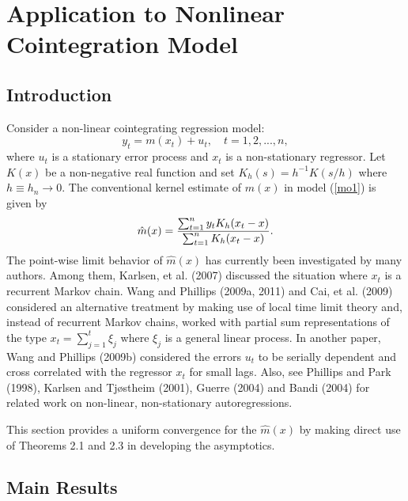 \chapter{Application to Nonlinear Cointegration Model}
\ifpdf
    \graphicspath{{Chapter3/Chapter3Figs/PNG/}{Chapter3/Chapter3Figs/PDF/}{Chapter3/Chapter3Figs/}}
\else
    \graphicspath{{Chapter3/Chapter3Figs/EPS/}{Chapter3/Chapter3Figs/}}
\fi

\section{Introduction}

Consider a non-linear cointegrating regression model:
\begin{equation}
y_{t}=m(x_{t})+u_{t},\quad t=1,2,...,n,  \label{mo1}
\end{equation}%
where $u_{t}$ is a stationary error process and $x_{t}$ is a
non-stationary
regressor. Let $K(x)$ be a non-negative real function and set $%
K_{h}(s)=h^{-1}K(s/h)$ where $h\equiv h_{n}\rightarrow 0$. The
conventional kernel estimate of $m(x)$ in model (\ref{mo1}) is given
by
\begin{equation}
\hat{m}(x)=\frac{\sum_{t=1}^{n}y_{t}K_{h}(x_{t}-x)}{%
\sum_{t=1}^{n}K_{h}(x_{t}-x)}.  \label{add9}
\end{equation}%
The point-wise  limit behavior of $\hat{m}(x)$ has currently been investigated
by many authors. Among them, Karlsen, et al. (2007) discussed the situation where $x_{t}$ is a recurrent Markov chain.  Wang and Phillips (2009a, 2011) and Cai, et al.
(2009) considered an alternative treatment by making use of local
time limit theory and, instead of recurrent Markov chains, worked
with partial
 sum representations of the type
 $x_t=\sum_{j=1}^t\xi_j$ where $\xi_j$ is a general linear process.
 In  another paper, Wang and Phillips (2009b) considered
  the errors $u_t$  to be serially dependent and
 cross correlated with the regressor $x_t$ for small lags.  Also, see Phillips and Park (1998), Karlsen and Tj\o stheim (2001), Guerre (2004) and Bandi (2004) for
related work on non-linear, non-stationary autoregressions.

This section provides a uniform convergence for the  $\hat{m}(x)$ by making direct use of Theorems 2.1 and 2.3 in developing the asymptotics. 

\section{Main Results}
